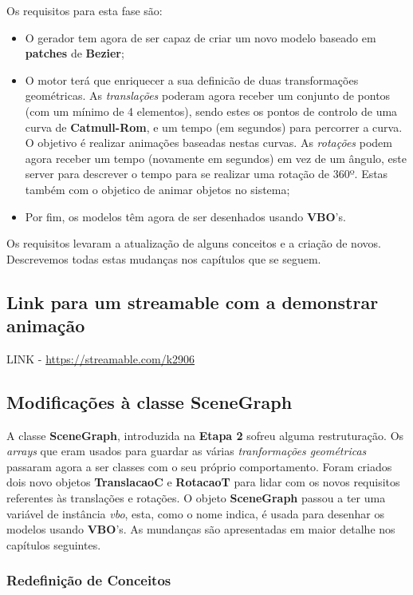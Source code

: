 \documentclass{article}
\begin{document}
Os requisitos para esta fase são:
\begin{itemize}
	\item O gerador tem agora de ser capaz de criar um novo modelo baseado em \textbf{patches} de \textbf{Bezier};
	\item O motor terá que enriquecer a sua definicão de duas transformações geométricas. As \textit{translações} poderam agora receber um conjunto de pontos (com um mínimo de 4 elementos), sendo estes os pontos de controlo de uma curva de \textbf{Catmull-Rom}, e um tempo (em segundos) para percorrer a curva. O objetivo é realizar animações baseadas nestas curvas. As \textit{rotações} podem agora receber um tempo (novamente em segundos) em vez de um ângulo, este server para descrever o tempo para se realizar uma rotação de 360º. Estas também com o objetico de animar objetos no sistema;
	\item Por fim, os modelos têm agora de ser desenhados usando \textbf{VBO}'s.
\end{itemize}

Os requisitos levaram a atualização de alguns conceitos e a criação de novos. Descrevemos todas estas mudanças nos capítulos que se seguem.

\subsection{Link para um streamable com a demonstrar animação}
LINK - \url{https://streamable.com/k2906}

\subsection{Modificações à classe SceneGraph}

A classe \textbf{SceneGraph}, introduzida na \textbf{Etapa 2} sofreu alguma restruturação. Os \textit{arrays} que eram usados para guardar as várias \textit{tranformações geométricas} passaram agora a ser classes com o seu próprio comportamento. Foram criados dois novo objetos \textbf{TranslacaoC} e \textbf{RotacaoT} para lidar com os novos requisitos referentes às translações e rotações. O objeto \textbf{SceneGraph} passou a ter uma variável de instância \textit{vbo}, esta, como o nome indica, é usada para desenhar os modelos usando \textbf{VBO}'s. As mundanças são apresentadas em maior detalhe nos capítulos seguintes.

\subsubsection{Redefinição de Conceitos}
\end{document}
